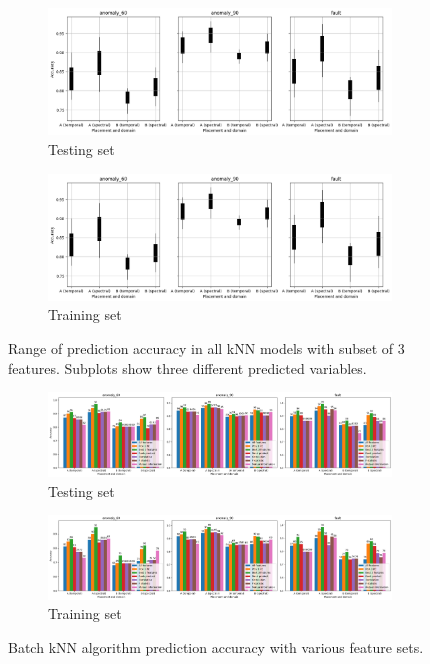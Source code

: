 \begin{figure}[ht]
    \centering
    \begin{subfigure}[b]{\textwidth}
        \includegraphics[width=\textwidth]{assets/design/kNN-3-features-combinations-train.png}
        \caption{Testing set}
    \end{subfigure}
    \hfill
    \begin{subfigure}[b]{\textwidth}
        \includegraphics[width=\textwidth]{assets/design/kNN-3-features-combinations-test.png}
        \caption{Training set}
    \end{subfigure}
    \caption{Range of prediction accuracy in all kNN models with subset of 3 features. Subplots show three different predicted variables.}
\end{figure}


\begin{figure}[ht]
    \centering
    \begin{subfigure}[b]{\textwidth}
        \includegraphics[width=\textwidth]{assets/design/kNN-feature-selection-predictions-train}
        \caption{Testing set}
    \end{subfigure}
    \hfill
    \begin{subfigure}[b]{\textwidth}
        \includegraphics[width=\textwidth]{assets/design/kNN-feature-selection-predictions-test}
        \caption{Training set}
    \end{subfigure} 
    \caption{Batch kNN algorithm prediction accuracy with various feature sets.}
\end{figure}

